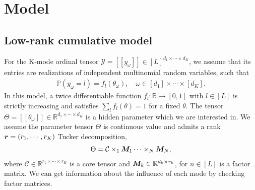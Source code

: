 \documentclass{article}
\theoremstyle{plain}
\theoremstyle{definition}
\begin{document}
\section{Model}
\subsection{Low-rank cumulative model}
For the K-mode ordinal tensor $\mathcal{Y} = [\![ y_\omega]\!]\in[L]^{d_1\times\cdots\times d_K}$, we assume that its entries are realizations of independent multinomial random variables, such that
\begin{equation}
    \begin{aligned}
        \label{mainmodel}
        \mathbb{P}(y_\omega=l) = f_l(\theta_\omega), \quad \omega\in [d_1]\times\cdots\times[d_K].
    \end{aligned}
\end{equation}
In this model, a twice differentiable function $f_l : \mathbb{R}\rightarrow [0,1]$ with $l\in [L]$ is strictly increasing and satisfies $\sum_l f_l(\theta) = 1$ for a fixed $\theta$.
The tensor $\Theta = [\![\theta_\omega]\!]\in \mathbb{R}^{d_1\times\cdots\times d_K}$
is a hidden parameter which we are interested in. We assume the parameter tensor $\Theta$ is continuous value and admits a rank $\bm{r} = (r_1,\cdots,r_K)$ Tucker decomposition,
\begin{equation}
    \begin{aligned}
        \label{tucker}
        \Theta = \mathcal{C}\times_1\bm M_1\cdots\times_N\bm M_N,
    \end{aligned}
\end{equation}
where $\mathcal{C}\in \mathbb{R}^{r_1\times\cdots\times r_K}$ is a core tensor and $\bm M_k\in \mathbb{R}^{d_k\times r_k}$, for $n \in [L]$ is a factor matrix. We can get information about the influence of each mode by checking factor matrices.
\end{document}
